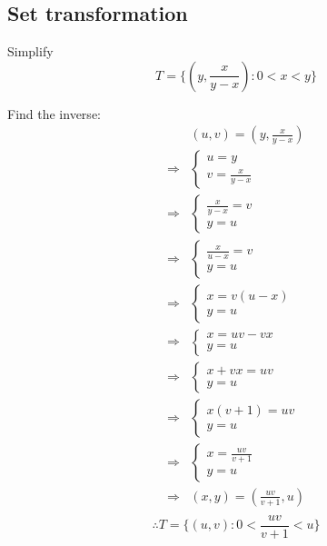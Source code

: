 \documentclass{article}
\begin{document}
\subsection{Set transformation}

\begin{sproblem}
Simplify
\[T = \{(y,\frac{x}{y-x}) : 0 < x < y\}\]
\end{sproblem}

\begin{ssolution}
Find the inverse:
\begin{align*}
	& (u,v) = (y,\frac{x}{y-x}) \\
	\Rightarrow& \begin{cases}u = y \\ v = \frac{x}{y-x}\end{cases} \\
	\Rightarrow& \begin{cases}\frac{x}{y-x} = v \\ y=u\end{cases} \\
	\Rightarrow& \begin{cases}\frac{x}{u-x} = v \\ y=u\end{cases} \\
	\Rightarrow& \begin{cases}x = v(u-x) \\ y=u\end{cases} \\
	\Rightarrow& \begin{cases}x = uv-vx \\ y=u\end{cases} \\
	\Rightarrow& \begin{cases}x+vx = uv \\ y=u\end{cases} \\
	\Rightarrow& \begin{cases}x(v+1) = uv \\ y=u\end{cases} \\
	\Rightarrow& \begin{cases}x = \frac{uv}{v+1} \\ y=u\end{cases} \\
	\Rightarrow& (x,y) = (\frac{uv}{v+1}, u) \\
\end{align*}
\[\therefore T = \{(u,v) : 0 < \frac{uv}{v+1} < u\}\]

\end{ssolution}
\end{document}
